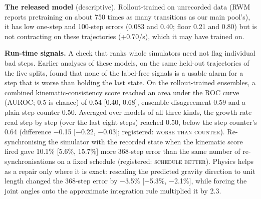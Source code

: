 \textbf{The released model} (descriptive). Rollout-trained on unrecorded data (RWM reports pretraining on about 750 times as many
transitions as our main pool's), it has low one-step
and 100-step errors (0.083 and 0.40; floor 0.21 and 0.80) but is not
contracting on these trajectories (+0.70/s), which it may have trained on.

\textbf{Run-time signals.} A check that ranks whole simulators need not flag individual bad steps. Earlier analyses of these models, on
the same held-out trajectories of the five splits, found that none of the label-free signals is a usable alarm for a
step that is worse than holding the last state. On the rollout-trained ensembles, a combined kinematic-consistency
score reached an area under the ROC curve (AUROC; 0.5 is chance) of 0.54 [0.40, 0.68], ensemble
disagreement 0.59 and a plain step counter 0.50. Averaged over models of all three kinds, the growth
rate read step by step (over the last eight steps) reached 0.50, below the step counter's 0.64
(difference $-$0.15 [$-$0.22, $-$0.03]; registered: \textsc{worse than counter}). Re-synchronising the simulator with the recorded state when the
kinematic score fired gave 10.1\% [5.6\%, 15.7\%] more 368-step error than the same number of
re-synchronisations on a fixed schedule (registered: \textsc{schedule better}). Physics helps as a repair only where it is exact: rescaling the predicted
gravity direction to unit length changed the 368-step error by $-$3.5\% [$-$5.3\%, $-$2.1\%], while forcing the joint
angles onto the approximate integration rule multiplied it by 2.3.

\FloatBarrier
